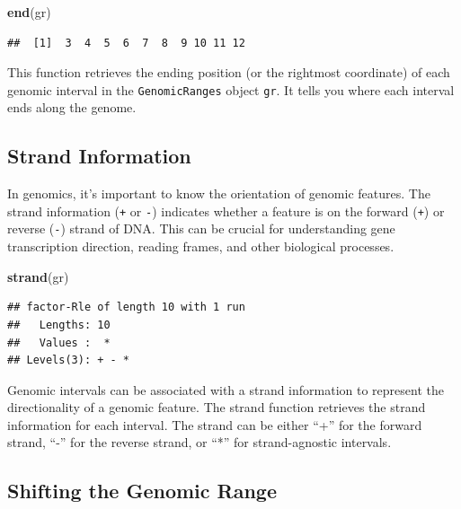 \documentclass[
]{book}
\newenvironment{Shaded}{\begin{snugshade}}{\end{snugshade}}
\newcommand{\FunctionTok}[1]{\textcolor[rgb]{0.13,0.29,0.53}{\textbf{#1}}}
\newcommand{\NormalTok}[1]{#1}
\begin{document}
\begin{Shaded}
\begin{Highlighting}[]
\FunctionTok{end}\NormalTok{(gr)}
\end{Highlighting}
\end{Shaded}

\begin{verbatim}
##  [1]  3  4  5  6  7  8  9 10 11 12
\end{verbatim}

This function retrieves the ending position (or the rightmost coordinate) of each genomic interval in the \texttt{GenomicRanges} object \texttt{gr}. It tells you where each interval ends along the genome.

\hypertarget{strand-information}{%
\subsection{Strand Information}\label{strand-information}}

In genomics, it's important to know the orientation of genomic features. The strand information (\texttt{+} or \texttt{-}) indicates whether a feature is on the forward (\texttt{+}) or reverse (\texttt{-}) strand of DNA. This can be crucial for understanding gene transcription direction, reading frames, and other biological processes.

\begin{Shaded}
\begin{Highlighting}[]
\FunctionTok{strand}\NormalTok{(gr)}
\end{Highlighting}
\end{Shaded}

\begin{verbatim}
## factor-Rle of length 10 with 1 run
##   Lengths: 10
##   Values :  *
## Levels(3): + - *
\end{verbatim}

Genomic intervals can be associated with a strand information to represent the directionality of a genomic feature. The strand function retrieves the strand information for each interval. The strand can be either ``+'' for the forward strand, ``-'' for the reverse strand, or ``*'' for strand-agnostic intervals.

\hypertarget{shifting-the-genomic-range}{%
\subsection{Shifting the Genomic Range}\label{shifting-the-genomic-range}}
\end{document}
